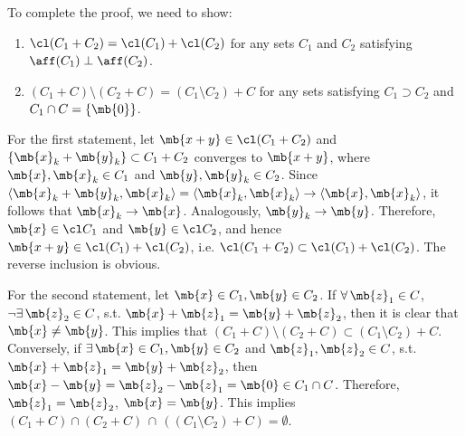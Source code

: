 \begin{exercise}
\begin{enumerate}
\begin{solution}
\begin{enumerate}
            To complete the proof, we need to show:
            \begin{enumerate}
              \item $\cl(C_1 + C_2)=\cl(C_1)+\cl(C_2)$ for any sets $C_1$ and $C_2$ satisfying $\aff(C_1)\perp\aff(C_2)$.
              \item $(C_1+C)\setminus(C_2+C) = (C_1\setminus C_2)+C$ for any sets satisfying $C_1\supset C_2$ and $C_1\cap C = \{\mb{0}\}$.
            \end{enumerate}
            For the first statement, let $\mb{x + y} \in \cl(C_1+C_2)$ and $\{\mb{x}_k + \mb{y}_k\}\subset C_1+C_2$ converges to $\mb{x+y}$, where $\mb{x}, \mb{x}_k \in C_1$ and $\mb{y}, \mb{y}_k \in C_2$. Since $\langle\mb{x}_k + \mb{y}_k, \mb{x}_k\rangle = \langle\mb{x}_k, \mb{x}_k\rangle \to \langle\mb{x}, \mb{x}_k\rangle$, it follows that $\mb{x}_k \to \mb{x}$. Analogously, $\mb{y}_k \to \mb{y}$. Therefore, $\mb{x}\in \cl C_1$ and $\mb{y}\in \cl C_2$, and hence $\mb{x+y}\in \cl(C_1) + \cl(C_2)$, i.e. $\cl(C_1+C_2)\subset\cl(C_1)+\cl(C_2)$. The reverse inclusion is obvious.

            For the second statement, let $\mb{x}\in C_1, \mb{y}\in C_2$. If $\forall\,\mb{z}_1\in C$, $\lnot\exists\,\mb{z}_2\in C$, s.t. $\mb{x} + \mb{z}_1 = \mb{y} + \mb{z}_2$, then it is clear that $\mb{x} \neq \mb{y}$. This implies that $(C_1+C)\setminus(C_2+C) \subset (C_1\setminus C_2)+C$. Conversely, if $\exists\,\mb{x}\in C_1, \mb{y}\in C_2$ and $ \mb{z}_1, \mb{z}_2\in C$, s.t. $\mb{x} + \mb{z}_1 = \mb{y} + \mb{z}_2$, then $\mb{x} - \mb{y} = \mb{z}_2 - \mb{z}_1 = \mb{0}\in C_1\cap C$. Therefore, $\mb{z}_1 = \mb{z}_2$, $\mb{x} = \mb{y}$. This implies $(C_1+C)\cap(C_2+C)\, \cap\, ((C_1\setminus C_2)+C) = \emptyset$.
        \end{enumerate}
        \qedhere
      \end{solution}
  \end{enumerate}
\end{exercise}
\newpage


